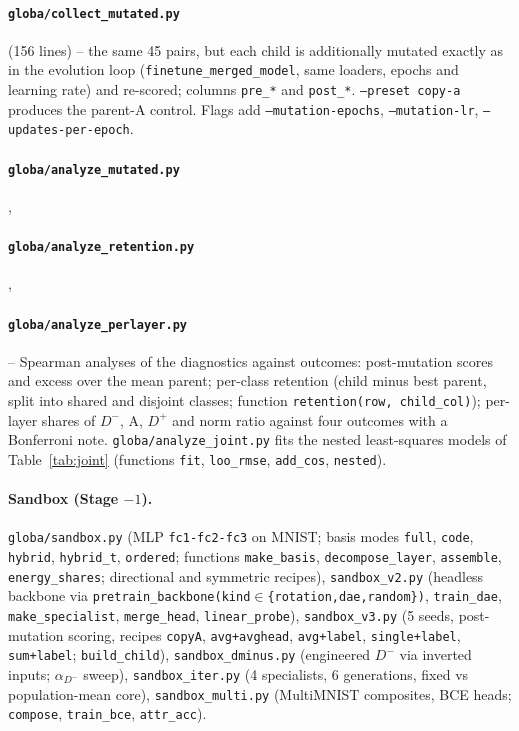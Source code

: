 \documentclass[11pt,a4paper]{article}
\newcommand{\Dp}{D^{+}}
\newcommand{\Dm}{D^{-}}
\newcommand{\code}[1]{\texttt{#1}}
\begin{document}
\paragraph{\code{globa/collect\_mutated.py}} (156 lines) -- the same 45 pairs, but each child is additionally mutated exactly as in the evolution loop (\code{finetune\_merged\_model}, same loaders, epochs and learning rate) and re-scored; columns \code{pre\_*} and \code{post\_*}. \code{--preset copy-a} produces the parent-A control. Flags add \code{--mutation-epochs}, \code{--mutation-lr}, \code{--updates-per-epoch}.

\paragraph{\code{globa/analyze\_mutated.py}}, \paragraph{\code{globa/analyze\_retention.py}}, \paragraph{\code{globa/analyze\_perlayer.py}} -- Spearman analyses of the diagnostics against outcomes: post-mutation scores and excess over the mean parent; per-class retention (child minus best parent, split into shared and disjoint classes; function \code{retention(row, child\_col)}); per-layer shares of $\Dm$, A, $\Dp$ and norm ratio against four outcomes with a Bonferroni note. \code{globa/analyze\_joint.py} fits the nested least-squares models of Table~\ref{tab:joint} (functions \code{fit}, \code{loo\_rmse}, \code{add\_cos}, \code{nested}).

\paragraph{Sandbox (Stage $-1$).} \code{globa/sandbox.py} (MLP \code{fc1-fc2-fc3} on MNIST; basis modes \code{full}, \code{code}, \code{hybrid}, \code{hybrid\_t}, \code{ordered}; functions \code{make\_basis}, \code{decompose\_layer}, \code{assemble}, \code{energy\_shares}; directional and symmetric recipes), \code{sandbox\_v2.py} (headless backbone via \code{pretrain\_backbone(kind$\in$\{rotation,dae,random\})}, \code{train\_dae}, \code{make\_specialist}, \code{merge\_head}, \code{linear\_probe}), \code{sandbox\_v3.py} (5 seeds, post-mutation scoring, recipes \code{copyA}, \code{avg+avghead}, \code{avg+label}, \code{single+label}, \code{sum+label}; \code{build\_child}), \code{sandbox\_dminus.py} (engineered $\Dm$ via inverted inputs; $\alpha_{\Dm}$ sweep), \code{sandbox\_iter.py} (4 specialists, 6 generations, fixed vs population-mean core), \code{sandbox\_multi.py} (MultiMNIST composites, BCE heads; \code{compose}, \code{train\_bce}, \code{attr\_acc}).
\end{document}
